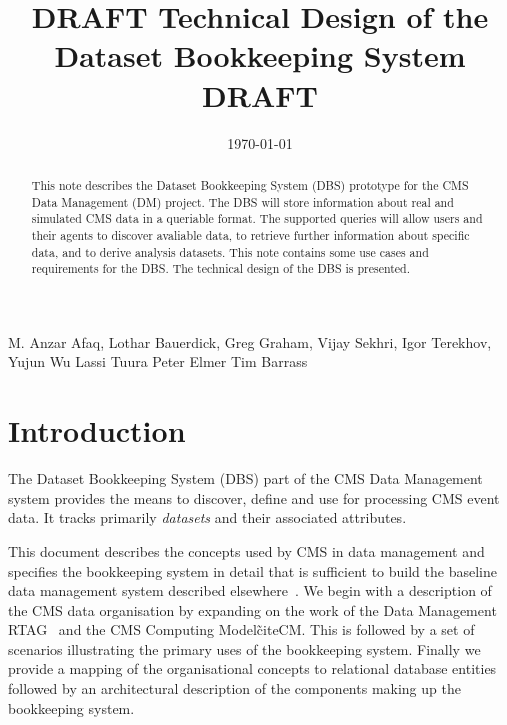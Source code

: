 \documentclass{cmspaper}
\begin{document}

\begin{titlepage}

   \date{\today}

  \title{DRAFT Technical Design of the Dataset Bookkeeping System DRAFT}


  \begin{Authlist}
    M. Anzar Afaq, Lothar Bauerdick, Greg Graham, Vijay Sekhri, Igor Terekhov, 
    Yujun Wu
    Lassi Tuura
    Peter Elmer
    Tim Barrass
  \end{Authlist}


  \begin{abstract}
      This note describes the Dataset Bookkeeping System (DBS) prototype for the 
  CMS Data Management (DM) project.  The DBS will
  store information about real and simulated CMS data in a queriable format.  The
  supported queries will allow users and their agents to discover avaliable 
  data, to retrieve further information about specific data, and to 
  derive analysis datasets. This note contains some use cases and requirements
  for the DBS.  The technical design of the DBS is presented.
    \end{abstract} 

  
\end{titlepage}

\setcounter{page}{2}%

\section{Introduction}

The Dataset Bookkeeping System (DBS) part of the CMS Data Management system
provides the means to discover, define and use for processing CMS event data.
It tracks primarily {\em datasets} and their associated attributes.

This document describes the concepts used by CMS in data management and
specifies the bookkeeping system in detail that is sufficient to build the
baseline data management system described elsewhere~\cite{dmman}.  We begin
with a description of the CMS data organisation by expanding on the work of
the Data Management RTAG~\cite{rtag7} and the CMS Computing Model\~cite{CM}.
This is followed by a set of scenarios illustrating the primary uses of the
bookkeeping system.  Finally we provide a mapping of the organisational
concepts to relational database entities followed by an architectural
description of the components making up the bookkeeping system.
\end{document}

